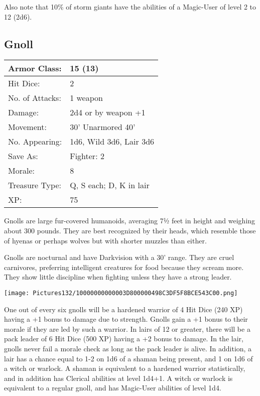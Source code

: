 \documentclass[a4paper,twoside,openany,10pt]{book}
\begin{document}
\begin{multicols}{2}
Also note that 10\% of storm giants have the abilities of a Magic-User of level 2 to 12 (2d6).


\subsection*{Gnoll}\label{gnoll}

\begin{tabularx}{0.48\textwidth}{@{}lX@{}}
Armor Class: & 15 (13) \\\hline
Hit Dice: & 2 \\\hline
No. of Attacks: & 1 weapon \\\hline
Damage: & 2d4 or by weapon +1 \\\hline
Movement: & 30' Unarmored 40' \\\hline
No. Appearing: & 1d6, Wild 3d6, Lair 3d6 \\\hline
Save As: & Fighter: 2 \\\hline
Morale: & 8 \\\hline
Treasure Type: & Q, S each; D, K in lair \\\hline
XP: & 75 \\\hline
\end{tabularx}\medskip

Gnolls are large fur-covered humanoids, averaging 7½ feet in height and weighing about 300 pounds. They are best recognized by their heads, which resemble those of hyenas or perhaps wolves but with shorter muzzles than either.

Gnolls are nocturnal and have Darkvision with a 30' range. They are cruel carnivores, preferring intelligent creatures for food because they scream more. They show little discipline when fighting unless they have a strong leader.


\begin{center}
	\texttt{[image: Pictures132/10000000000003D800000498C3DF5F8BCE543C00.png]}
\end{center}


One out of every six gnolls will be a hardened warrior of 4 Hit Dice (240 XP) having a +1 bonus to damage due to strength. Gnolls gain a +1 bonus to their morale if they are led by such a warrior. In lairs of 12 or greater, there will be a pack leader of 6 Hit Dice (500 XP) having a +2 bonus to damage. In the lair, gnolls never fail a morale check as long as the pack leader is alive. In addition, a lair has a chance equal to 1-2 on 1d6 of a shaman being present, and 1 on 1d6 of a witch or warlock. A shaman is equivalent to a hardened warrior statistically, and in addition has Clerical abilities at level 1d4+1. A witch or warlock is equivalent to a regular gnoll, and has Magic-User abilities of level 1d4.


\end{multicols}
\end{document}
